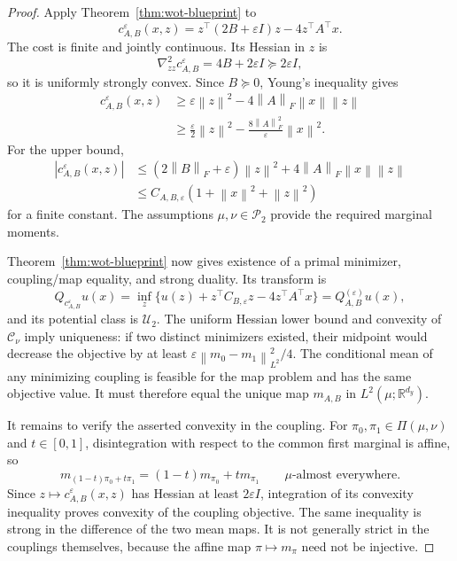 \documentclass[11pt]{article}
\newcommand{\R}{\mathbb R}
\newcommand{\cP}{\mathcal P}
\newcommand{\cU}{\mathcal U}
\newcommand{\norm}[1]{\left\lVert #1\right\rVert}
\theoremstyle{plain}
\theoremstyle{definition}
\theoremstyle{remark}
\begin{document}
\begin{proof}
Apply Theorem~\ref{thm:wot-blueprint} to
\[
 c_{A,B}^\varepsilon(x,z)
 =z^\top(2B+\varepsilon I)z-4z^\top A^\top x.
\]
The cost is finite and jointly continuous.  Its Hessian in $z$ is
\[
 \nabla_{zz}^2c_{A,B}^\varepsilon=4B+2\varepsilon I
 \succeq2\varepsilon I,
\]
so it is uniformly strongly convex.  Since $B\succeq0$, Young's inequality gives
\begin{align*}
 c_{A,B}^\varepsilon(x,z)
 &\ge\varepsilon\norm z^2-4\norm A_F\norm x\norm z\\
 &\ge\frac\varepsilon2\norm z^2
 -\frac{8\norm A_F^2}{\varepsilon}\norm x^2.
\end{align*}
For the upper bound,
\begin{align*}
 |c_{A,B}^\varepsilon(x,z)|
 &\le(2\norm B_F+\varepsilon)\norm z^2
 +4\norm A_F\norm x\norm z\\
 &\le C_{A,B,\varepsilon}(1+\norm x^2+\norm z^2)
\end{align*}
for a finite constant.  The assumptions
$\mu,\nu\in\cP_2$ provide the required marginal moments.

Theorem~\ref{thm:wot-blueprint} now gives existence of a primal minimizer, coupling/map equality,
and strong duality.  Its transform is
\[
 Q_{c_{A,B}^\varepsilon}u(x)
 =\inf_z\{u(z)+z^\top C_{B,\varepsilon}z-4z^\top A^\top x\}
 =Q_{A,B}^{(\varepsilon)}u(x),
\]
and its potential class is $\cU_2$.  The uniform Hessian lower bound and
convexity of $\mathcal C_\nu$ imply uniqueness: if two distinct minimizers existed,
their midpoint would decrease the objective by at least
$\varepsilon\norm{m_0-m_1}_{L^2}^2/4$.
The conditional mean of any minimizing coupling is feasible for the map problem
and has the same objective value.  It must therefore equal the unique map
$m_{A,B}$ in $L^2(\mu;\R^{d_y})$.

It remains to verify the asserted convexity in the coupling.  For
$\pi_0,\pi_1\in\Pi(\mu,\nu)$ and $t\in[0,1]$, disintegration with respect to the
common first marginal is affine, so
\[
 m_{(1-t)\pi_0+t\pi_1}=(1-t)m_{\pi_0}+tm_{\pi_1}
 \qquad\mu\text{-almost everywhere}.
\]
Since $z\mapsto c_{A,B}^\varepsilon(x,z)$ has Hessian at least
$2\varepsilon I$, integration of its convexity inequality proves convexity of
the coupling objective.  The same inequality is strong in the difference of
the two mean maps.  It is not generally strict in the couplings themselves,
because the affine map $\pi\mapsto m_\pi$ need not be injective.


\end{proof}
\end{document}
